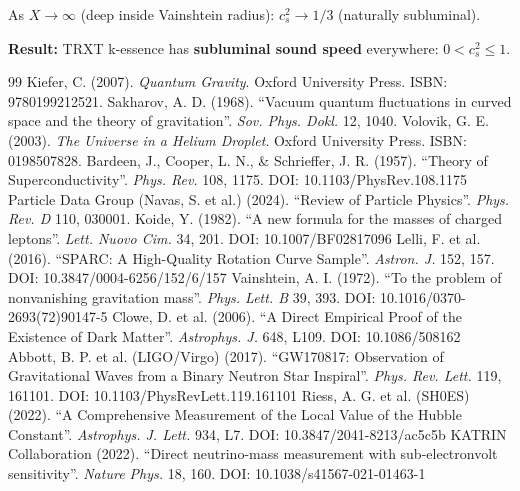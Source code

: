 \documentclass[a4paper,12pt]{article}
\begin{document}
As $X \to \infty$ (deep inside Vainshtein radius): $c_s^2 \to 1/3$ (naturally subluminal).

\begin{mdframed}[backgroundcolor=green!10]
\textbf{Result:} TRXT k-essence has \textbf{subluminal sound speed} everywhere: $0 < c_s^2 \leq 1$.
\end{mdframed}

\begin{thebibliography}{99}
 Kiefer, C. (2007). \textit{Quantum Gravity}. Oxford University Press. ISBN: 9780199212521.
 Sakharov, A. D. (1968). ``Vacuum quantum fluctuations in curved space and the theory of gravitation''. \textit{Sov. Phys. Dokl.} 12, 1040.
 Volovik, G. E. (2003). \textit{The Universe in a Helium Droplet}. Oxford University Press. ISBN: 0198507828.
 Bardeen, J., Cooper, L. N., \& Schrieffer, J. R. (1957). ``Theory of Superconductivity''. \textit{Phys. Rev.} 108, 1175. DOI: 10.1103/PhysRev.108.1175
 Particle Data Group (Navas, S. et al.) (2024). ``Review of Particle Physics''. \textit{Phys. Rev. D} 110, 030001.
 Koide, Y. (1982). ``A new formula for the masses of charged leptons''. \textit{Lett. Nuovo Cim.} 34, 201. DOI: 10.1007/BF02817096
 Lelli, F. et al. (2016). ``SPARC: A High-Quality Rotation Curve Sample''. \textit{Astron. J.} 152, 157. DOI: 10.3847/0004-6256/152/6/157
 Vainshtein, A. I. (1972). ``To the problem of nonvanishing gravitation mass''. \textit{Phys. Lett. B} 39, 393. DOI: 10.1016/0370-2693(72)90147-5
 Clowe, D. et al. (2006). ``A Direct Empirical Proof of the Existence of Dark Matter''. \textit{Astrophys. J.} 648, L109. DOI: 10.1086/508162
 Abbott, B. P. et al. (LIGO/Virgo) (2017). ``GW170817: Observation of Gravitational Waves from a Binary Neutron Star Inspiral''. \textit{Phys. Rev. Lett.} 119, 161101. DOI: 10.1103/PhysRevLett.119.161101
 Riess, A. G. et al. (SH0ES) (2022). ``A Comprehensive Measurement of the Local Value of the Hubble Constant''. \textit{Astrophys. J. Lett.} 934, L7. DOI: 10.3847/2041-8213/ac5c5b
 KATRIN Collaboration (2022). ``Direct neutrino-mass measurement with sub-electronvolt sensitivity''. \textit{Nature Phys.} 18, 160. DOI: 10.1038/s41567-021-01463-1



\end{thebibliography}
\end{document}
